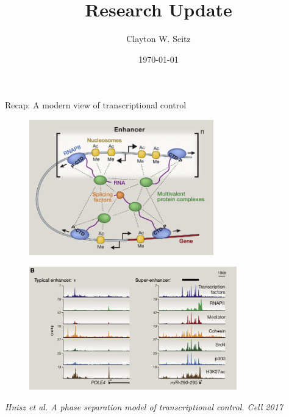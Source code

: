 \documentclass{beamer}					%
\title{Research Update}	%
\author{Clayton W. Seitz}								%
\date{\today}									%
\begin{document}
\begin{frame}
  \titlepage
\end{frame}


%

\begin{frame}{Recap: A modern view of transcriptional control}
\begin{figure}
\includegraphics[width=8cm]{figure-5-6.png}
\end{figure}
\begin{figure}
\includegraphics[width=9cm]{figure-5-2.png}
\end{figure}
\textit{Hnisz et al. A phase separation model of transcriptional control. Cell 2017}
\end{frame}
\end{document}
